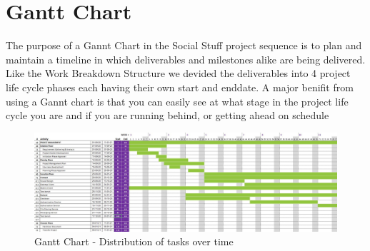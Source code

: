 \section{Gantt Chart}

The purpose of a Gannt Chart in the Social Stuff project sequence is to plan and maintain a timeline in which deliverables and milestones alike are being delivered.
Like the Work Breakdown Structure we devided the deliverables into 4 project life cycle phases each having their own start and enddate. A major benifit from using a Gannt chart is that you can easily see at what stage in the project life cycle you are and if you are running behind, or getting ahead on schedule

\begin{figure}[H]
    \centering
    \hspace*{-3.25cm}
    \includegraphics[width=2.0\textwidth]{./images/gantt}
    \caption{Gantt Chart - Distribution of tasks over time}
    \label{fig:figure44}
\end{figure}
